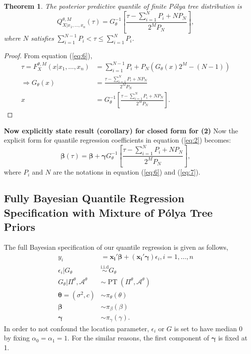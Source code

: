 \documentclass[12pt]{article}
\newtheorem{thm}{Theorem}[subsection]
\newcommand{\polya}{P\'{o}lya}
\newcommand{\iid}{\stackrel{\text{i.i.d}}{\sim}}
\DeclareMathOperator{\pt}{PT}
\begin{document}
\begin{thm}
  The posterior predictive quantile of finite \polya{} tree
  distribution is 
  \begin{equation}
    \label{eq:7}
    Q^{\theta, M}_{X|x_1, \ldots, x_n}(\tau) = G^{-1}_{\theta} \left[
      \frac{\tau- \sum_{i=1}^N P_i + N P_N}{2^M P_N} \right],
  \end{equation}
  where $N$ satisfies $ \sum_{i=1}^{N-1} P_i < \tau \le \sum_{i=1}^N P_i$.
\end{thm}

\begin{proof}
  From equation (\ref{eq:6}), 
  \begin{align*}
    \tau = F^{\theta,M}_X(x|x_1, \ldots, x_n) &= \sum_{i=1}^{N-1} P_{i} + P_N
    \left( G_{\theta}(x)2^M -(N-1) \right) \\
    \Rightarrow G_{\theta}(x) &= \frac{\tau - \sum_{i=1}^NP_i +
      NP_N}{2^MP_N} \\
    x & = G_{\theta}^{-1} \left[\frac{\tau - \sum_{i=1}^NP_i +
        NP_N}{2^MP_N}  \right].
  \end{align*}
\end{proof}
{\bf Now explicitly state result (corollary) for closed form for (2)}
Now the explicit form for quantile regression coefficients in equation
(\ref{eq:2}) becomes: 
\begin{equation}
\label{eq:9}
  \bm{\beta}(\tau) = \bm{\beta} + \bm{\gamma}G_{\theta}^{-1}
  \left[\frac{\tau - \sum_{i=1}^NP_i + 
        NP_N}{2^MP_N}  \right] ,
\end{equation}
where $P_i$ and $N$ are the notations in equation (\ref{eq:6}) and (\ref{eq:7}).

\subsection{Fully Bayesian Quantile Regression Specification with Mixture of \polya{}
  Tree Priors}
The full Bayesian specification of our quantile regression is given as
follows, 
\begin{align*}
  y_i& = \bm{x_i'\beta} + (\bm{x_i'\gamma}) \epsilon_{i}, i = 1, \ldots,
  n \\
  \epsilon_i |G_{\theta} & \iid G_{\theta} \\
  G_{\theta}|\Pi^{\theta}, \mathcal{A}^{\theta} & \sim \pt
  (\Pi^{\theta}, \mathcal{A}^{\theta}) \\
  \bm{\theta} = (\sigma^2, c) & \sim \pi_{\theta}(\theta) \\
  \bm{\beta} & \sim \pi_{\beta}(\beta)\\
  \bm{\gamma} &\sim \pi_{\gamma}(\gamma).
\end{align*} 
In order to not confound the location parameter, $\epsilon_i $ or $G$
is set to have median 0 by fixing $\alpha_0=\alpha_1 = 1$. For the
similar reasons,
the first component of $\bm{\gamma}$ is fixed
at 1. 
\end{document}
